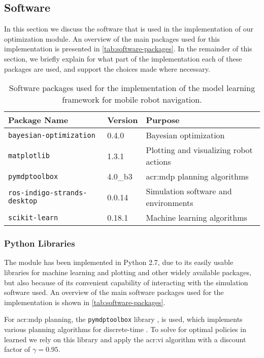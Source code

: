 \subsection{Software}
\label{sec:software}

In this section we discuss the software that is used in the implementation of our optimization module. 
An overview of the main packages used for this implementation is presented in \autoref{tab:software-packages}.
In the remainder of this section, we briefly explain for what part of the implementation each of these packages are used, and support the choices made where necessary.

\begin{table}[pt]
\caption{Software packages used for the implementation of the model learning framework for mobile robot navigation.}
\label{tab:software-packages}\centering
\begin{tabular}{|l|l|l|}
	\hline%
	\textbf{Package Name} & \textbf{Version} & \textbf{Purpose} \\
	\hline
	\texttt{bayesian-optimization} & 0.4.0 & Bayesian optimization \\
	\texttt{matplotlib} & 1.3.1 & Plotting and visualizing robot actions \\
	\texttt{pymdptoolbox} & 4.0\_b3 & \acrshort{acr:mdp} planning algorithms \\
	\texttt{ros-indigo-strands-desktop} & 0.0.14 & Simulation software and environments\\
	\texttt{scikit-learn} & 0.18.1 & Machine learning algorithms \\ \hline
\end{tabular}
\end{table}

\subsubsection{Python Libraries}

The module has been implemented in Python 2.7, due to its easily usable libraries for machine learning and plotting and other widely available packages, but also because of its convenient capability of interacting with the simulation software used.
An overview of the main software packages used for the implementation is shown in \autoref{tab:software-packages}.

\newpage

For \acrshort{acr:mdp} planning, the \texttt{pymdptoolbox} library \cite{cordwellpymdptoolbox}, is used, which implements various planning algorithms for discrete-time . 
To solve for optimal policies in learned  we rely on this library and apply the \acrshort{acr:vi} algorithm with a discount factor of $\gamma = 0.95$.

